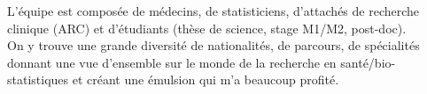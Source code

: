\documentclass{book}
\begin{document}
\noindent
L'équipe est composée de médecins, de statisticiens, d'attachés de recherche clinique (ARC) et d'étudiants (thèse de science, stage M1/M2, post-doc).\\
On y trouve une grande diversité de nationalités, de parcours, de spécialités donnant une vue d'ensemble sur le monde de la recherche en santé/bio-statistiques et créant une émulsion qui m'a beaucoup profité.\\



\end{document}
